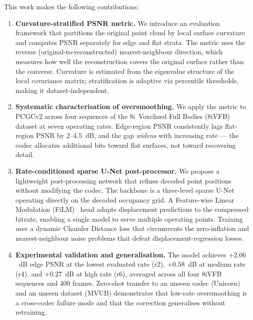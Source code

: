 This work makes the following contributions:

\begin{enumerate}[label=\textbf{\arabic*.}]
  \item \textbf{Curvature-stratified PSNR metric.}
    We introduce an evaluation framework that partitions the original point
    cloud by local surface curvature and computes PSNR separately for edge
    and flat strata.
    The metric uses the reverse (original-to-reconstructed) nearest-neighbour
    direction, which measures how well the reconstruction covers the original
    surface rather than the converse.
    Curvature is estimated from the eigenvalue structure of the local
    covariance matrix; stratification is adaptive via percentile thresholds,
    making it dataset-independent.

  \item \textbf{Systematic characterisation of oversmoothing.}
    We apply the metric to PCGCv2 across four sequences of the
    8i~Voxelized Full Bodies (8iVFB) dataset at seven operating rates.
    Edge-region PSNR consistently lags flat-region PSNR by 2--4.5~dB, and
    the gap \emph{widens} with increasing rate --- the codec allocates
    additional bits toward flat surfaces, not toward recovering detail.

  \item \textbf{Rate-conditioned sparse U-Net post-processor.}
    We propose a lightweight post-processing network that refines decoded point
    positions without modifying the codec.
    The backbone is a three-level sparse U-Net operating directly on the
    decoded occupancy grid.
    A Feature-wise Linear Modulation (FiLM)~\cite{perez2018film} head adapts
    displacement predictions to the compressed bitrate, enabling a single model
    to serve multiple operating points.
    Training uses a dynamic Chamfer Distance loss that circumvents the
    zero-inflation and nearest-neighbour noise problems that defeat
    displacement-regression losses.

  \item \textbf{Experimental validation and generalisation.}
    The model achieves $+2.06$~dB edge PSNR at the lowest evaluated rate
    (r2), $+0.58$~dB at medium rate (r4), and $+0.27$~dB at high rate (r6),
    averaged across all four 8iVFB sequences and 400 frames.
    Zero-shot transfer to an unseen codec (Unicorn) and an unseen dataset
    (MVUB) demonstrates that low-rate oversmoothing is a cross-codec failure
    mode and that the correction generalises without retraining.
\end{enumerate}

